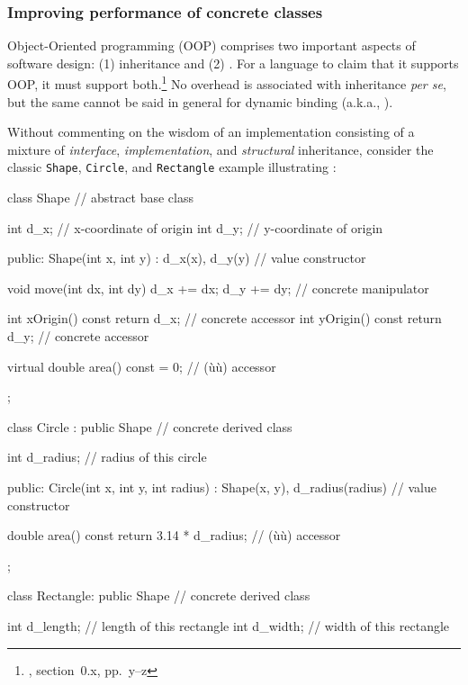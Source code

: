 {{\subsubsection[Improving performance of concrete classes]{Improving performance of concrete classes}\label{improving-performance-of-concrete-classes}

Object-Oriented programming (OOP) comprises two important aspects of
software design: (1) inheritance and (2) . For a
language to claim that it supports OOP, it must support
both.{\cprotect\footnote{\cite{stroustrup91}, section~0.x, pp.~y--z}} No
overhead is associated with inheritance \emph{per se}, but the same
cannot be said in general for dynamic binding (a.k.a., ).

Without commenting on the wisdom of an implementation consisting of a
mixture of \emph{interface}, \emph{implementation}, and
\emph{structural} inheritance, consider the classic \lstinline!Shape!,
\lstinline!Circle!, and \lstinline!Rectangle! example illustrating
:

\begin{emcppslisting}
class Shape  // abstract base class
{
    int d_x;  // x-coordinate of origin
    int d_y;  // y-coordinate of origin

public:
    Shape(int x, int y) : d_x(x), d_y(y) { }    // value constructor

    void move(int dx, int dy) { d_x += dx; d_y += dy; }
                                                // concrete manipulator

    int xOrigin() const { return d_x; }         // concrete accessor
    int yOrigin() const { return d_y; }         // concrete accessor

    virtual double area() const = 0;            // (ù{}ù) accessor
};

class Circle : public Shape  // concrete derived class
{
    int d_radius;  // radius of this circle

public:
    Circle(int x, int y, int radius) : Shape(x, y), d_radius(radius) { }
                                                // value constructor

    double area() const { return 3.14 * d_radius; }
                                                // (ù{}ù) accessor
};

class Rectangle: public Shape   // concrete derived class
{
    int d_length;  // length of this rectangle
    int d_width;   // width of this rectangle

}
\end{emcppslisting}}}
